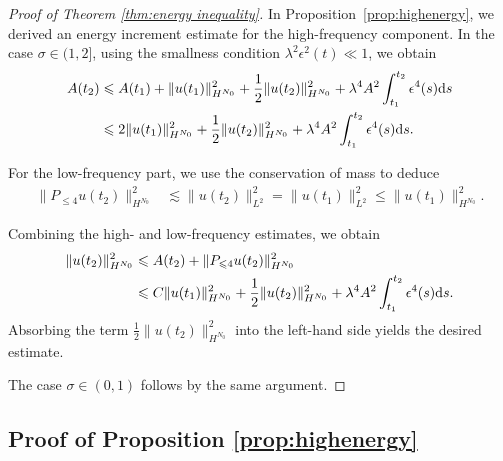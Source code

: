 \documentclass[UTF-8,reqno]{amsart}
\numberwithin{equation}{section}
\theoremstyle{definition}
\def\dif{{\mathord{{\rm d}}}}
\def\leq{\leqslant}
\def\dif{{\mathord{{\rm d}}}}
\def\leq{\leqslant}
\begin{document}
\begin{proof}[Proof of Theorem \ref{thm:energy inequality}]
In Proposition~\ref{prop:highenergy}, we derived an energy increment estimate 
for the high-frequency component. 
In the case $\sigma\in(1,2]$, using the smallness condition 
$\lambda^2 \epsilon^2(t)\ll 1$, we obtain 
 \begin{align*}
    A(t_2)&\leq A(t_1)+ \|u(t_1)\|_{H^{N_0}}^2+\frac12\|u(t_2)\|_{H^{N_0}}^2+\lambda^4A^2\int_{t_1}^{t_2}\epsilon^4(s)\dif s\\
    &\leq  2\|u(t_1)\|_{H^{N_0}}^2+\frac12\|u(t_2)\|_{H^{N_0}}^2+\lambda^4A^2\int_{t_1}^{t_2}\epsilon^4(s)\dif s.
\end{align*}

For the low-frequency part, we use the conservation of mass to deduce
\begin{align*}
    \|P_{\leq 4}u(t_2)\|_{H^{N_0}}^2&\lesssim \|u(t_2)\|_{L^2}^2=\|u(t_1)\|_{L^2}^2 \leq \|u(t_1)\|_{H^{N_0}}^2.
\end{align*}
 
Combining the high- and low-frequency estimates, we obtain
    \begin{align*}
        \|u(t_2)\|_{H^{N_0}}^2&\leq  A(t_2)+\|P_{\leq 4}u(t_2)\|_{H^{N_0}}^2\\
        &\leq   C\|u(t_1)\|_{H^{N_0}}^2+\frac12\|u(t_2)\|_{H^{N_0}}^2+\lambda^4A^2\int_{t_1}^{t_2}\epsilon^4(s)\dif s.
    \end{align*}
  Absorbing the term $\tfrac12\|u(t_2)\|_{H^{N_0}}^2$ into the left-hand side yields the desired estimate.

The case $\sigma\in(0,1)$ follows by the same argument.
\end{proof}
 

\subsection{ Proof of  Proposition \ref{prop:highenergy}}
 
\end{document}
